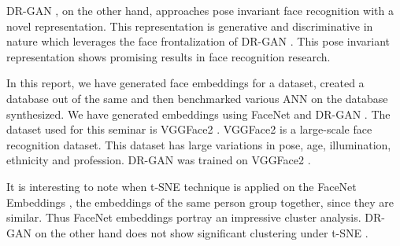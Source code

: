 \documentclass[12pt]{article}
\renewcommand{\_}{\kern-1.5pt\textunderscore\kern-1.5pt}
\begin{document}
\begin{justify}
DR-GAN  \cite{tran2017disentangled}  , on the other hand, approaches pose invariant face recognition with a novel representation. This representation is generative and discriminative in nature which leverages the face frontalization of DR-GAN  \cite{tran2017disentangled}  . This pose invariant representation shows promising results in face recognition research.
\end{justify}\par

\begin{justify}
In this report, we have generated face embeddings for a dataset, created a database out of the same and then benchmarked various ANN on the database synthesized. We have generated embeddings using FaceNet \cite{schroff2015facenet}  and DR-GAN  \cite{tran2017disentangled}  . The dataset used for this seminar is VGGFace2 \cite{cao2018vggface2} . VGGFace2 \cite{cao2018vggface2} is a large-scale face recognition dataset. This dataset has large variations in pose, age, illumination, ethnicity and profession. DR-GAN \cite{tran2017disentangled}  was trained on VGGFace2 \cite{cao2018vggface2}.
\end{justify}\par

It is interesting to note when t-SNE technique  \cite{maaten2008visualizing}  is applied on the FaceNet Embeddings \cite{schroff2015facenet} , the embeddings of the same person group together, since they are similar. Thus FaceNet embeddings \cite{schroff2015facenet}  portray an impressive cluster analysis. DR-GAN  \cite{tran2017disentangled} on the other hand does not show significant clustering under t-SNE \cite{maaten2008visualizing} .\par
\end{document}
